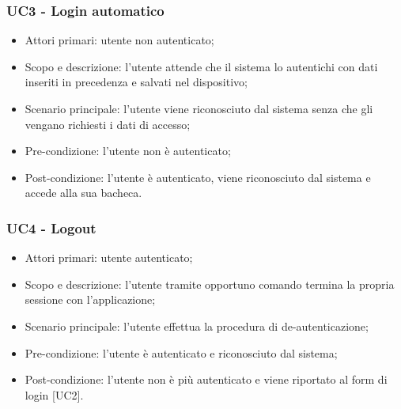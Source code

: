 \subsubsection{UC3 - Login automatico}
\begin{itemize}
	\item  Attori primari: utente non autenticato;
	\item  Scopo e descrizione: l'utente attende che il sistema lo autentichi con dati inseriti in precedenza e salvati nel dispositivo;
	\item  Scenario principale: l'utente viene riconosciuto dal sistema senza che gli vengano richiesti i dati di accesso;
	\item  Pre-condizione: l'utente non è autenticato;
	\item  Post-condizione: l'utente è autenticato, viene riconosciuto dal sistema e accede alla sua bacheca.
\end{itemize}
\subsubsection{UC4 - Logout}
\begin{itemize}
	\item  Attori primari: utente autenticato;
	\item  Scopo e descrizione: l'utente tramite opportuno comando termina la propria sessione con l'applicazione;
	\item  Scenario principale: l'utente effettua la procedura di de-autenticazione;
	\item  Pre-condizione: l'utente è autenticato e riconosciuto dal sistema;
	\item  Post-condizione: l'utente non è più autenticato e viene riportato al form di login [UC2].
\end{itemize}
